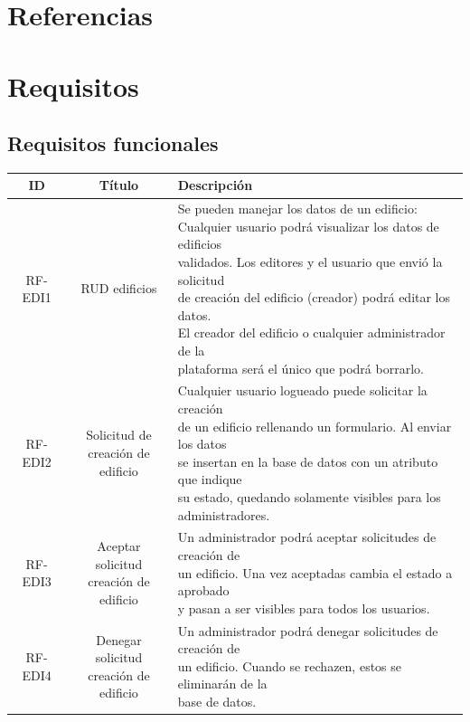 \documentclass[12pt, a4paper, twoside]{article}
\begin{document}
\section{Referencias}

\section{Requisitos}
\subsection{Requisitos funcionales}
{\footnotesize
\begin{longtable}{ |c|c|l| }
  \hline
  ID      & Título & Descripción \\ \hline
  RF-EDI1 & RUD edificios & \makecell[l]{Se pueden manejar los datos de un edificio: \\
    Cualquier usuario podrá visualizar los datos de edificios \\
    validados. Los editores y el usuario que envió la solicitud\\
    de creación del edificio (creador) podrá editar los datos. \\
    El creador del edificio o cualquier administrador de la \\
    plataforma será el único que podrá borrarlo.
    } \\ \hline
  RF-EDI2 & \makecell{Solicitud de \\ creación de edificio}
    & \makecell[l]{Cualquier usuario logueado puede solicitar la creación\\
    de un edificio rellenando un formulario. Al enviar los datos \\
    se insertan en la base de datos con un atributo que indique \\
    su estado, quedando solamente visibles para los
    \\ administradores. 
    } \\ \hline
  RF-EDI3 & \makecell{Aceptar solicitud \\ creación de edificio}
    & \makecell[l]{Un administrador podrá aceptar solicitudes de creación de \\
    un edificio. Una vez aceptadas cambia el estado a aprobado \\
    y pasan a ser visibles para todos los usuarios.
    }\\ \hline
  RF-EDI4 & \makecell{Denegar solicitud \\ creación de edificio}
    & \makecell[l]{Un administrador podrá denegar solicitudes de creación de \\
    un edificio. Cuando se rechazen, estos se eliminarán de la \\
    base de datos. 
    } \\ \hline
  

\end{longtable}}
\end{document}
